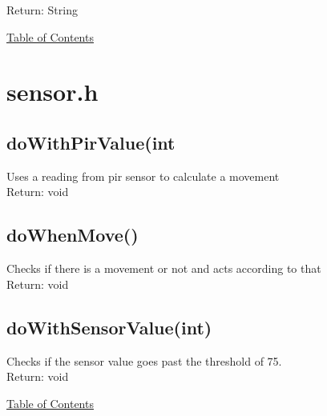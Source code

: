 \documentclass[11pt, numbers=endperiod]{article}
\begin{document}
Return: String

\hyperlink{toc}{Table of Contents}

\section{sensor.h}
\label{sec: sensor.h}

\subsection*{doWithPirValue(int}
Uses a reading from pir sensor to calculate a movement\\

Return: void

\subsection*{doWhenMove()}
Checks if there is a movement or not and acts according to that\\

Return: void

\subsection*{doWithSensorValue(int)}
Checks if the sensor value goes past the threshold of 75.\\

Return: void


\hyperlink{toc}{Table of Contents}
\end{document}
